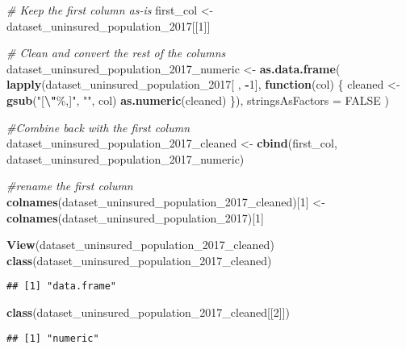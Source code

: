\documentclass[
]{article}
\newenvironment{Shaded}{\begin{snugshade}}{\end{snugshade}}
\newcommand{\AttributeTok}[1]{\textcolor[rgb]{0.13,0.29,0.53}{#1}}
\newcommand{\CommentTok}[1]{\textcolor[rgb]{0.56,0.35,0.01}{\textit{#1}}}
\newcommand{\ConstantTok}[1]{\textcolor[rgb]{0.56,0.35,0.01}{#1}}
\newcommand{\ControlFlowTok}[1]{\textcolor[rgb]{0.13,0.29,0.53}{\textbf{#1}}}
\newcommand{\DecValTok}[1]{\textcolor[rgb]{0.00,0.00,0.81}{#1}}
\newcommand{\FunctionTok}[1]{\textcolor[rgb]{0.13,0.29,0.53}{\textbf{#1}}}
\newcommand{\NormalTok}[1]{#1}
\newcommand{\OtherTok}[1]{\textcolor[rgb]{0.56,0.35,0.01}{#1}}
\newcommand{\SpecialCharTok}[1]{\textcolor[rgb]{0.81,0.36,0.00}{\textbf{#1}}}
\newcommand{\StringTok}[1]{\textcolor[rgb]{0.31,0.60,0.02}{#1}}
\begin{document}
\begin{Shaded}
\begin{Highlighting}[]
\CommentTok{\# Keep the first column as{-}is}
\NormalTok{first\_col }\OtherTok{\textless{}{-}}\NormalTok{ dataset\_uninsured\_population\_2017[[}\DecValTok{1}\NormalTok{]]}

\CommentTok{\# Clean and convert the rest of the columns}
\NormalTok{dataset\_uninsured\_population\_2017\_numeric }\OtherTok{\textless{}{-}} \FunctionTok{as.data.frame}\NormalTok{(}
  \FunctionTok{lapply}\NormalTok{(dataset\_uninsured\_population\_2017[ , }\SpecialCharTok{{-}}\DecValTok{1}\NormalTok{], }\ControlFlowTok{function}\NormalTok{(col) \{}
\NormalTok{    cleaned }\OtherTok{\textless{}{-}} \FunctionTok{gsub}\NormalTok{(}\StringTok{"[}\SpecialCharTok{\textbackslash{}"}\StringTok{\%,]"}\NormalTok{, }\StringTok{""}\NormalTok{, col)}
    \FunctionTok{as.numeric}\NormalTok{(cleaned)}
\NormalTok{  \}),}
  \AttributeTok{stringsAsFactors =} \ConstantTok{FALSE}
\NormalTok{)}

\CommentTok{\#Combine back with the first column}
\NormalTok{dataset\_uninsured\_population\_2017\_cleaned }\OtherTok{\textless{}{-}} \FunctionTok{cbind}\NormalTok{(first\_col, dataset\_uninsured\_population\_2017\_numeric)}

\CommentTok{\#rename the first column}
\FunctionTok{colnames}\NormalTok{(dataset\_uninsured\_population\_2017\_cleaned)[}\DecValTok{1}\NormalTok{] }\OtherTok{\textless{}{-}} \FunctionTok{colnames}\NormalTok{(dataset\_uninsured\_population\_2017)[}\DecValTok{1}\NormalTok{]}

\FunctionTok{View}\NormalTok{(dataset\_uninsured\_population\_2017\_cleaned)}
\FunctionTok{class}\NormalTok{(dataset\_uninsured\_population\_2017\_cleaned)}
\end{Highlighting}
\end{Shaded}

\begin{verbatim}
## [1] "data.frame"
\end{verbatim}

\begin{Shaded}
\begin{Highlighting}[]
\FunctionTok{class}\NormalTok{(dataset\_uninsured\_population\_2017\_cleaned[[}\DecValTok{2}\NormalTok{]])}
\end{Highlighting}
\end{Shaded}

\begin{verbatim}
## [1] "numeric"
\end{verbatim}
\end{document}
